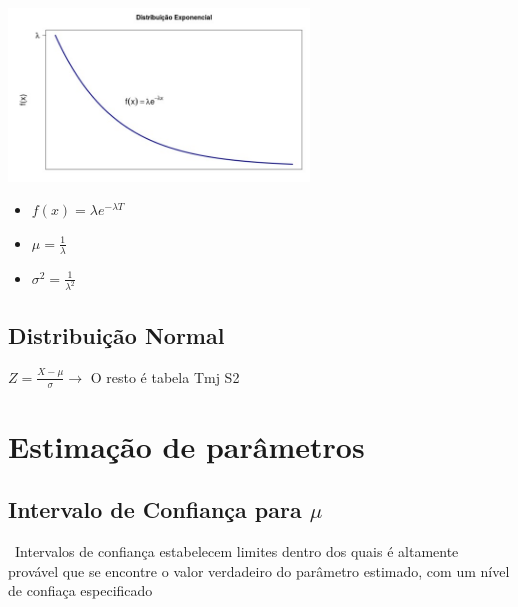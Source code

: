 \documentclass{article}
\begin{document}
  \begin{multicols}{2}

    \hbox{\includegraphics[width=8cm]{Distribuição exponelcial.jpg}}

    \begin{itemize}
      \item $ f(x) = \lambda e^{-\lambda T}$
      \item $ \mu = \frac{1}{\lambda} $
      \item $ \sigma^2 = \frac{1}{\lambda^2}$
    \end{itemize}

  \end{multicols}

  \subsection{Distribuição Normal}
  \begin{center}
    $ Z = \frac{X - \mu}{\sigma} \rightarrow $ O resto é tabela Tmj S2
  \end{center}

  \newpage

\section{Estimação de parâmetros}

  \subsection{Intervalo de Confiança para $ \mu $}

  \ Intervalos de confiança estabelecem limites dentro dos quais é altamente
  provável que se encontre o valor verdadeiro do parâmetro estimado, com um nível
  de confiaça especificado
\end{document}
